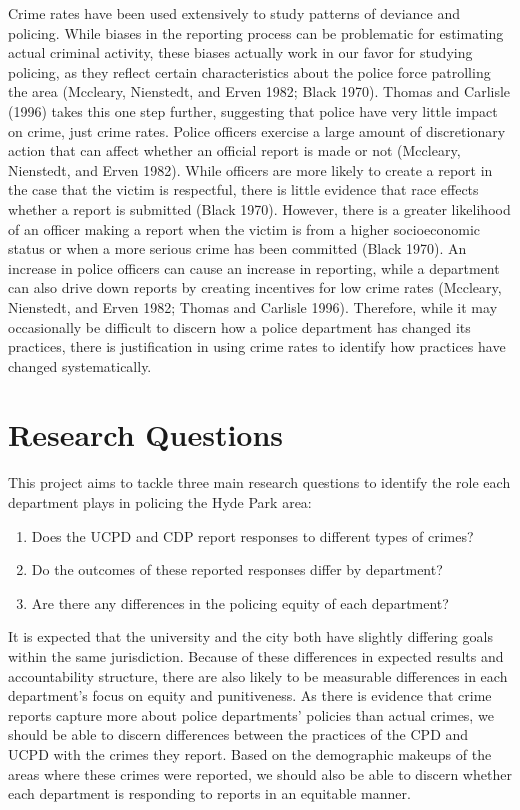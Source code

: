 \documentclass{ucetd}
\providecommand{\tightlist}{%
  \setlength{\itemsep}{0pt}\setlength{\parskip}{0pt}}
\begin{document}
Crime rates have been used extensively to study patterns of deviance and
policing. While biases in the reporting process can be problematic for
estimating actual criminal activity, these biases actually work in our
favor for studying policing, as they reflect certain characteristics
about the police force patrolling the area (Mccleary, Nienstedt, and
Erven 1982; Black 1970). Thomas and Carlisle (1996) takes this one step
further, suggesting that police have very little impact on crime, just
crime rates. Police officers exercise a large amount of discretionary
action that can affect whether an official report is made or not
(Mccleary, Nienstedt, and Erven 1982). While officers are more likely to
create a report in the case that the victim is respectful, there is
little evidence that race effects whether a report is submitted (Black
1970). However, there is a greater likelihood of an officer making a
report when the victim is from a higher socioeconomic status or when a
more serious crime has been committed (Black 1970). An increase in
police officers can cause an increase in reporting, while a department
can also drive down reports by creating incentives for low crime rates
(Mccleary, Nienstedt, and Erven 1982; Thomas and Carlisle 1996).
Therefore, while it may occasionally be difficult to discern how a
police department has changed its practices, there is justification in
using crime rates to identify how practices have changed systematically.

\hypertarget{research-questions}{%
\chapter{Research Questions}\label{research-questions}}

This project aims to tackle three main research questions to identify
the role each department plays in policing the Hyde Park area:

\begin{enumerate}
\def\labelenumi{\arabic{enumi}.}
\tightlist
\item
  Does the UCPD and CDP report responses to different types of crimes?
\item
  Do the outcomes of these reported responses differ by department?
\item
  Are there any differences in the policing equity of each department?
\end{enumerate}

It is expected that the university and the city both have slightly
differing goals within the same jurisdiction. Because of these
differences in expected results and accountability structure, there are
also likely to be measurable differences in each department's focus on
equity and punitiveness. As there is evidence that crime reports capture
more about police departments' policies than actual crimes, we should be
able to discern differences between the practices of the CPD and UCPD
with the crimes they report. Based on the demographic makeups of the
areas where these crimes were reported, we should also be able to
discern whether each department is responding to reports in an equitable
manner.
\end{document}
